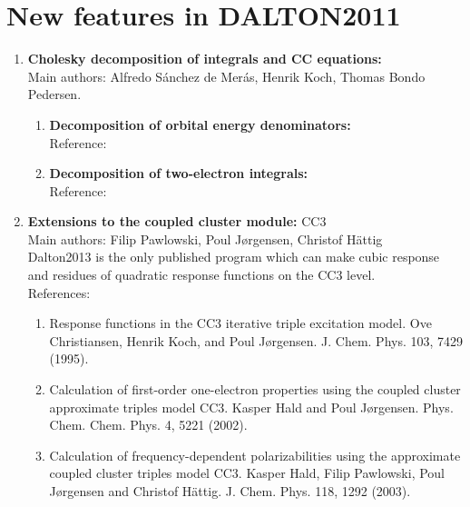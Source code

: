 \section{New features in DALTON2011}

\begin{enumerate}

\item{\bf Cholesky decomposition of integrals and CC equations:} \\
Main authors: Alfredo S{\'a}nchez {de Mer{\'a}s}, Henrik Koch,
Thomas Bondo Pedersen.
\begin{enumerate}
  \item{\bf Decomposition of orbital energy denominators:}  \\
   Reference:  \cite{jcp_chopt}
  \item{\bf Decomposition of two-electron integrals:}  \\
   Reference:  \cite{choint}
\end{enumerate}

\item{\bf Extensions to the coupled cluster module:} CC3 \\
Main authors: Filip Pawlowski, Poul J\o rgensen, Christof H\"{a}ttig \\
Dalton2013 is the only published program which can make cubic response
and residues of quadratic response functions on the CC3 level. \\
   References:
\begin{enumerate}
\item	Response functions in the CC3 iterative triple excitation model.
Ove Christiansen, Henrik Koch, and Poul J\o rgensen.
J. Chem. Phys. 103, 7429 (1995).

\item	Calculation of first-order one-electron properties using the
coupled cluster approximate triples model CC3.
Kasper Hald and Poul J\o rgensen.
Phys. Chem. Chem. Phys. 4, 5221 (2002).

\item	Calculation of frequency-dependent polarizabilities using the
approximate coupled cluster triples model CC3.
Kasper Hald, Filip Pawlowski, Poul J\o rgensen and Christof H\"{a}ttig.
J. Chem. Phys. 118, 1292 (2003).


\end{enumerate}
\end{enumerate}
